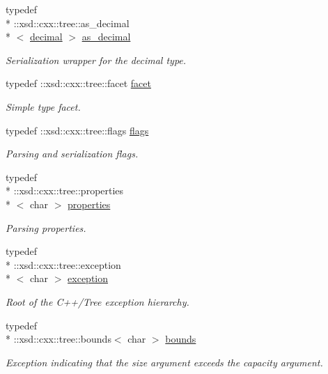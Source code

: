 \begin{DoxyCompactItemize}
typedef \\*
\+::xsd\+::cxx\+::tree\+::as\+\_\+decimal\\*
$<$ \hyperlink{namespacexml__schema_a69bfaf24f63a8c18ebd8e21db6b343df}{decimal} $>$ \hyperlink{namespacexml__schema_a60dfdca63dedf12d8a524c0496def693}{as\+\_\+decimal}
\begin{DoxyCompactList}\small\item\em Serialization wrapper for the decimal type. \end{DoxyCompactList}\item 
typedef \+::xsd\+::cxx\+::tree\+::facet \hyperlink{namespacexml__schema_ae447ddf0dd2470b5a095774e0b359a86}{facet}
\begin{DoxyCompactList}\small\item\em Simple type facet. \end{DoxyCompactList}\item 
typedef \+::xsd\+::cxx\+::tree\+::flags \hyperlink{namespacexml__schema_a8d981c127a1f5106d04ad5853e707361}{flags}
\begin{DoxyCompactList}\small\item\em Parsing and serialization flags. \end{DoxyCompactList}\item 
typedef \\*
\+::xsd\+::cxx\+::tree\+::properties\\*
$<$ char $>$ \hyperlink{namespacexml__schema_aba199bc39c8b21c427369c27d2bcfc8c}{properties}
\begin{DoxyCompactList}\small\item\em Parsing properties. \end{DoxyCompactList}\item 
typedef \\*
\+::xsd\+::cxx\+::tree\+::exception\\*
$<$ char $>$ \hyperlink{namespacexml__schema_a7eb0fa6af3de36ea17011d26a731b62b}{exception}
\begin{DoxyCompactList}\small\item\em Root of the C++/\+Tree exception hierarchy. \end{DoxyCompactList}\item 
typedef \\*
\+::xsd\+::cxx\+::tree\+::bounds$<$ char $>$ \hyperlink{namespacexml__schema_a00337f2f08dbcb24280f5cf7b96224ea}{bounds}
\begin{DoxyCompactList}\small\item\em Exception indicating that the size argument exceeds the capacity argument. \end{DoxyCompactList}\item 

\end{DoxyCompactItemize}

